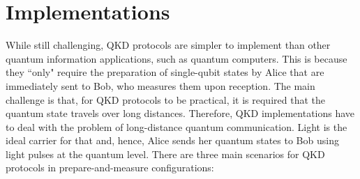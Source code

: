 \documentclass[a4paper]{article}
\begin{document}
\section{Implementations}

While still challenging, QKD protocols are simpler to implement than other quantum information applications, such as quantum computers. This is because they ``only" require the preparation of single-qubit states by Alice that are immediately sent to Bob, who measures them upon reception. The main challenge is that, for QKD protocols to be practical, it is required that the quantum state travels over long distances. Therefore, QKD implementations have to deal with the problem of long-distance quantum communication. Light is the ideal carrier for that and, hence, Alice sends her quantum states to Bob using light pulses at the quantum level. There are three main scenarios for QKD protocols in prepare-and-measure configurations:
\end{document}
